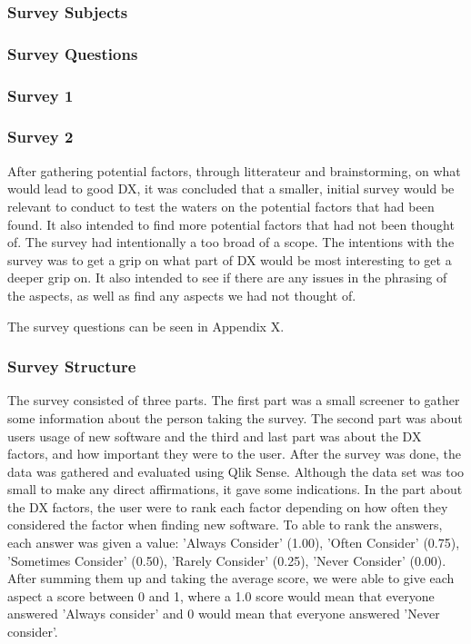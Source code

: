 \documentclass{article}
\begin{document}
\subsubsection{Survey Subjects}

\subsubsection{Survey Questions}

\subsubsection{Survey 1}

\subsubsection{Survey 2}

After gathering potential factors, through litterateur and
brainstorming, on what would lead to good DX, it was concluded that a
smaller, initial survey would be relevant to conduct to test the waters
on the potential factors that had been found. It also intended to find
more potential factors that had not been thought of. The survey had intentionally
a too broad of a scope.
The intentions with the survey was to get a grip on what part of DX would be most interesting
to get a deeper grip on. It also intended to see if there are any issues in the
phrasing of the aspects, as well as find any aspects we had not thought of.

The survey questions can be seen in
Appendix X.

\subsubsection{Survey Structure}

The survey consisted of three parts. The first part was a small screener
to gather some information about the person taking the survey. The
second part was about users usage of new software and the third and last
part was about the DX factors, and how important they were to the user.
After the survey was done, the data was gathered and evaluated using
Qlik Sense. Although the data set was too small to make any direct
affirmations, it gave some indications. In the part about the DX
factors, the user were to rank each factor depending on how often they
considered the factor when finding new software. To able to rank the
answers, each answer was given a value: 'Always Consider' (1.00), 'Often
Consider' (0.75), 'Sometimes Consider' (0.50), 'Rarely Consider' (0.25),
'Never Consider' (0.00). After summing them up and taking the average score, we were able to give each
aspect a score between 0 and 1, where a 1.0 score would mean that
everyone answered 'Always consider' and 0 would mean that everyone
answered 'Never consider'.
\end{document}
